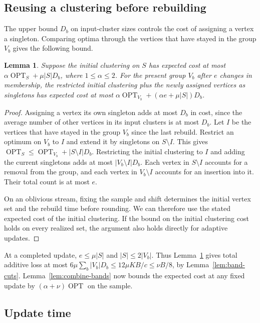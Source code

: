 \documentclass[11pt]{article}
\newtheorem{lemma}[theorem]{Lemma}
\newcommand{\OPT}{\operatorname{OPT}}
\begin{document}
\subsection{Reusing a clustering before rebuilding}

The upper bound $D_b$ on input-cluster sizes controls the cost of assigning a vertex
a singleton. Comparing optima through the vertices that have
stayed in the group $V_b$ gives the following bound.

\begin{lemma}\label{lem:dynamic-band}
Suppose the initial clustering on $S$ has expected cost at most
$\alpha\OPT_S+\mu|S|D_b$, where $1\le\alpha\le2$. For the present
group $V_b$ after $e$ changes in membership, the restricted initial clustering plus
the newly assigned vertices as singletons has expected cost at most
$\alpha\OPT_{V_b}+(\alpha e+\mu|S|)D_b$.
\end{lemma}
\begin{proof}
Assigning a vertex its own singleton adds at most $D_b$ in cost,
since the average number of other vertices in its input clusters is
at most $D_b$. Let $I$ be the vertices that have stayed in the group $V_b$
since the last rebuild. Restrict an optimum on $V_b$ to $I$ and extend
it by singletons on $S\setminus I$. This gives
$\OPT_S\le\OPT_{V_b}+|S\setminus I|D_b$. Restricting the initial clustering to $I$
and adding the current singletons adds at most $|V_b\setminus I|D_b$.
Each vertex in $S\setminus I$ accounts for a removal from the group,
and each vertex in $V_b\setminus I$ accounts for an insertion into it. Their total count is at most $e$.

On an oblivious stream, fixing the sample and shift determines the
initial vertex set and the rebuild time before rounding. We can therefore use
the stated expected cost of the initial clustering. If the bound on the initial clustering cost holds on every
realized set, the argument also holds directly for adaptive updates.
\end{proof}

At a completed update, $e\le\mu|S|$ and $|S|\le2|V_b|$. Thus
Lemma~\ref{lem:dynamic-band} gives total additive loss at most
$6\mu\sum_b|V_b|D_b\le12\mu KB/c\le\nu B/8$, by
Lemma~\ref{lem:band-cuts}. Lemma~\ref{lem:combine-bands} now bounds the expected cost at any
fixed update by $(\alpha+\nu)\OPT$ on the sample.

\subsection{Update time}
\end{document}
